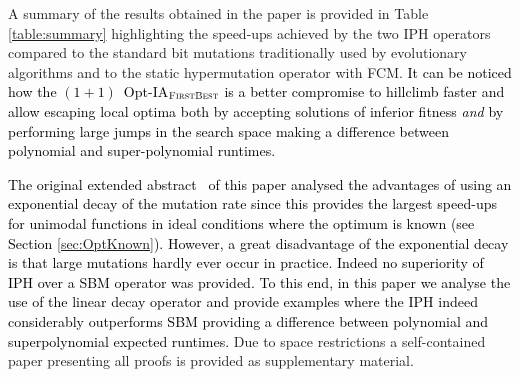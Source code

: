\documentclass[lettersize,journal]{IEEEtran}
\newcommand{\new}[1]{\textcolor{black}{#1}}
\begin{document}


A summary of the results obtained in the paper is provided in Table \ref{table:summary} highlighting the speed-ups achieved by the two IPH operators compared to the standard bit mutations traditionally  used by evolutionary algorithms and to the static hypermutation operator with FCM.
\new{It can be noticed how the $(1+1)$~Opt-IA$_{\textsc{FirstBest}}$ is a better compromise to hillclimb faster and allow escaping local optima both by accepting solutions of inferior fitness {\it and} by performing large jumps in the search space making a difference between polynomial and super-polynomial runtimes.}

\new{The original extended abstract~\cite{CorusOlivetoYazdaniIPH2019} of this paper analysed the advantages of using an exponential decay of the mutation rate since this provides the largest speed-ups for unimodal functions in ideal conditions where the optimum is known (see Section \ref{sec:OptKnown}). However, a great disadvantage of the exponential decay is that large mutations hardly ever occur in practice. Indeed no superiority of IPH over a SBM operator was provided.  To this end, in this paper we analyse the use of the linear decay operator and  provide examples where the IPH indeed considerably outperforms SBM providing a difference between polynomial and superpolynomial expected runtimes.}
Due to space restrictions a self-contained paper presenting all proofs is provided as supplementary material.
\end{document}

